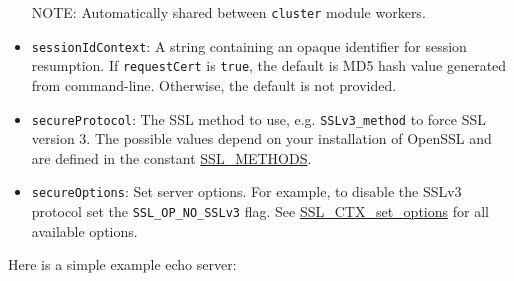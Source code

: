 \begin{itemize}
  NOTE: Automatically shared between \texttt{cluster} module workers.
\item
  \texttt{sessionIdContext}: A string containing an opaque identifier
  for session resumption. If \texttt{requestCert} is \texttt{true}, the
  default is MD5 hash value generated from command-line. Otherwise, the
  default is not provided.
\item
  \texttt{secureProtocol}: The SSL method to use, e.g.
  \texttt{SSLv3\_method} to force SSL version 3. The possible values
  depend on your installation of OpenSSL and are defined in the constant
  \href{http://www.openssl.org/docs/ssl/ssl.html\#DEALING_WITH_PROTOCOL_METHODS}{SSL\_METHODS}.
\item
  \texttt{secureOptions}: Set server options. For example, to disable
  the SSLv3 protocol set the \texttt{SSL\_OP\_NO\_SSLv3} flag. See
  \href{https://www.openssl.org/docs/ssl/SSL_CTX_set_options.html}{SSL\_CTX\_set\_options}
  for all available options.
\end{itemize}

Here is a simple example echo server:

